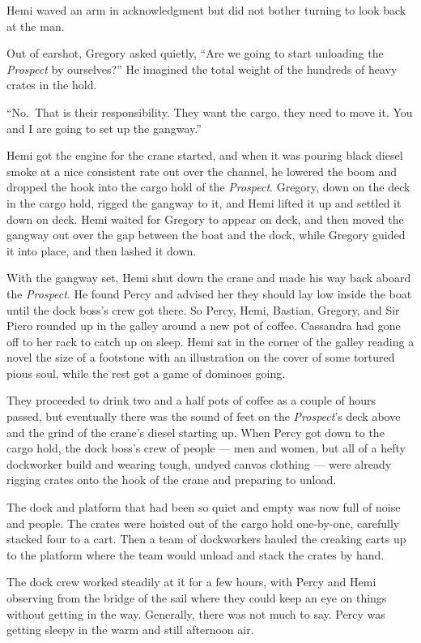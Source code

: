 \documentclass[
]{scrbook}
\begin{document}
Hemi waved an arm in acknowledgment but did not bother turning to look
back at the man.

Out of earshot, Gregory asked quietly, ``Are we going to start unloading
the \emph{Prospect} by ourselves?'' He imagined the total weight of the
hundreds of heavy crates in the hold.

``No.~That is their responsibility. They want the cargo, they need to
move it. You and I are going to set up the gangway.''

Hemi got the engine for the crane started, and when it was pouring black
diesel smoke at a nice consistent rate out over the channel, he lowered
the boom and dropped the hook into the cargo hold of the
\emph{Prospect}. Gregory, down on the deck in the cargo hold, rigged the
gangway to it, and Hemi lifted it up and settled it down on deck. Hemi
waited for Gregory to appear on deck, and then moved the gangway out
over the gap between the boat and the dock, while Gregory guided it into
place, and then lashed it down.

With the gangway set, Hemi shut down the crane and made his way back
aboard the \emph{Prospect}. He found Percy and advised her they should
lay low inside the boat until the dock boss's crew got there. So Percy,
Hemi, Bastian, Gregory, and Sir Piero rounded up in the galley around a
new pot of coffee. Cassandra had gone off to her rack to catch up on
sleep. Hemi sat in the corner of the galley reading a novel the size of
a footstone with an illustration on the cover of some tortured pious
soul, while the rest got a game of dominoes going.

They proceeded to drink two and a half pots of coffee as a couple of
hours passed, but eventually there was the sound of feet on the
\emph{Prospect}'s deck above and the grind of the crane's diesel
starting up. When Percy got down to the cargo hold, the dock boss's crew
of people --- men and women, but all of a hefty dockworker build and
wearing tough, undyed canvas clothing --- were already rigging crates
onto the hook of the crane and preparing to unload.

The dock and platform that had been so quiet and empty was now full of
noise and people. The crates were hoisted out of the cargo hold
one-by-one, carefully stacked four to a cart. Then a team of dockworkers
hauled the creaking carts up to the platform where the team would unload
and stack the crates by hand.

The dock crew worked steadily at it for a few hours, with Percy and Hemi
observing from the bridge of the sail where they could keep an eye on
things without getting in the way. Generally, there was not much to say.
Percy was getting sleepy in the warm and still afternoon air.
\end{document}
